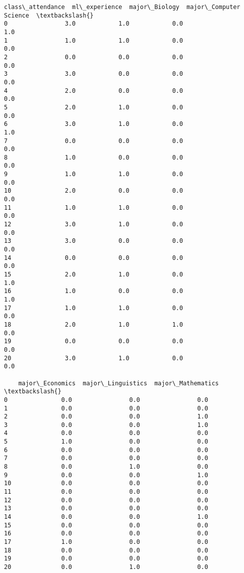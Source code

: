 \documentclass[11pt]{article}
\begin{document}
\begin{tcolorbox}[breakable, size=fbox, boxrule=.5pt, pad at break*=1mm, opacityfill=0]
\begin{Verbatim}[commandchars=\\\{\}]
    class\_attendance  ml\_experience  major\_Biology  major\_Computer Science  \textbackslash{}
0                3.0            1.0            0.0                     1.0
1                1.0            1.0            0.0                     0.0
2                0.0            0.0            0.0                     0.0
3                3.0            0.0            0.0                     0.0
4                2.0            0.0            0.0                     0.0
5                2.0            1.0            0.0                     0.0
6                3.0            1.0            0.0                     1.0
7                0.0            0.0            0.0                     0.0
8                1.0            0.0            0.0                     0.0
9                1.0            1.0            0.0                     0.0
10               2.0            0.0            0.0                     0.0
11               1.0            1.0            0.0                     0.0
12               3.0            1.0            0.0                     0.0
13               3.0            0.0            0.0                     0.0
14               0.0            0.0            0.0                     0.0
15               2.0            1.0            0.0                     1.0
16               1.0            0.0            0.0                     1.0
17               1.0            1.0            0.0                     0.0
18               2.0            1.0            1.0                     0.0
19               0.0            0.0            0.0                     0.0
20               3.0            1.0            0.0                     0.0

    major\_Economics  major\_Linguistics  major\_Mathematics  \textbackslash{}
0               0.0                0.0                0.0
1               0.0                0.0                0.0
2               0.0                0.0                1.0
3               0.0                0.0                1.0
4               0.0                0.0                0.0
5               1.0                0.0                0.0
6               0.0                0.0                0.0
7               0.0                0.0                0.0
8               0.0                1.0                0.0
9               0.0                0.0                1.0
10              0.0                0.0                0.0
11              0.0                0.0                0.0
12              0.0                0.0                0.0
13              0.0                0.0                0.0
14              0.0                0.0                1.0
15              0.0                0.0                0.0
16              0.0                0.0                0.0
17              1.0                0.0                0.0
18              0.0                0.0                0.0
19              0.0                0.0                0.0
20              0.0                1.0                0.0


\end{Verbatim}
\end{tcolorbox}
\end{document}
